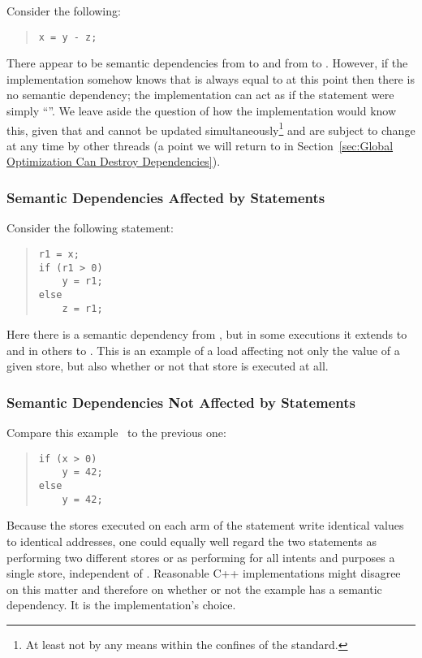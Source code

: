 Consider the following:
\begin{quote}
\begin{verbatim}
x = y - z;
\end{verbatim}
\end{quote}
There appear to be semantic dependencies from  to  and from 
to .
However, if the implementation somehow knows that  is
always equal to  at this point then there is no semantic dependency;
the implementation can act as if the statement were simply ``''.
We leave aside the question of how the implementation would know this,
given that  and  cannot be updated simultaneously\footnote{
	At least not by any means within the confines of the standard.}
and are subject to change at any time by
other threads (a point we will return to in
Section~\ref{sec:Global Optimization Can Destroy Dependencies}).

\subsubsection{Semantic Dependencies Affected by  Statements}
\label{sec:Semantic Dependencies Affected by if Statements}

Consider the following  statement:
\begin{quote}
\begin{verbatim}
r1 = x;
if (r1 > 0)
    y = r1;
else
    z = r1;
\end{verbatim}
\end{quote}
Here there is a semantic dependency from , but in some executions
it extends to  and in others to .
This is an example of a load affecting not only the value of
a given store, but also whether or not that store is executed at all.

\subsubsection{Semantic Dependencies Not Affected by  Statements}
\label{sec:Semantic Dependencies Not Affected by if Statements}

Compare this example~\cite{Howells2009membartxt} to the previous one:
\begin{quote}
\begin{verbatim}
if (x > 0)
    y = 42;
else
    y = 42;
\end{verbatim}
\end{quote}
Because the stores executed on each arm of the  statement write
identical values to identical addresses, one could equally well regard
the two statements as performing two different stores or as performing
for all intents and purposes a single store, independent of .
Reasonable C++ implementations might disagree on this matter and
therefore on whether or not the example has a semantic dependency.
It is the implementation's choice.

